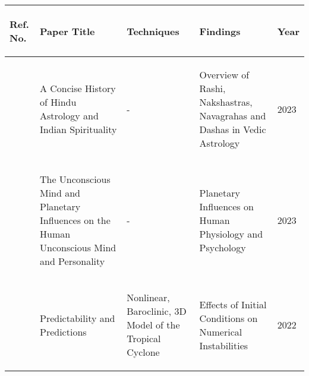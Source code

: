 \begin{tabularx}{\columnwidth}{|X|X|X|X|X|}
	\hline
	\begin{center}\textbf{Ref. No.}\end{center} & \begin{center}\textbf{Paper Title}\end{center} & \begin{center}\textbf{Techniques}\end{center} & \begin{center}\textbf{Findings}\end{center} & \begin{center}\textbf{Year}\end{center}\\
	\hline
	\begin{center}\cite{article2}\end{center} & \begin{center}A Concise History of Hindu Astrology and Indian Spirituality\end{center} & \begin{center}-\end{center} & \begin{center}Overview of Rashi, Nakshastras, Navagrahas and Dashas in Vedic Astrology\end{center} & \begin{center}2023\end{center}\\
	\hline
	\begin{center}\cite{article1}\end{center} & \begin{center}The Unconscious Mind and Planetary Influences on the Human Unconscious Mind and Personality\end{center} & \begin{center}-\end{center} & \begin{center}Planetary Influences on Human Physiology and Psychology\end{center} & \begin{center}2023\end{center}\\
	\hline
	\begin{center}\cite{atmos13081292}\end{center} & \begin{center}Predictability and Predictions\end{center} & \begin{center}Nonlinear, Baroclinic, 3D Model of the Tropical Cyclone\end{center} & \begin{center}Effects of Initial Conditions on Numerical Instabilities\end{center} & \begin{center}2022\end{center}\\
	\hline
\end{tabularx}

